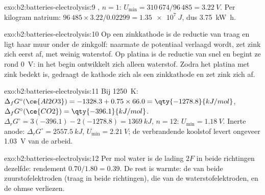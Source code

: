 \begin{solution}{exo:b2:batteries-electrolysis:9}
, $n = 1$: $U_{\min} = 310\,674/96\,485 = \qty{3.22}{V}$.
Per kilogram natrium: $96\,485 \times 3.22/0.02299 = \qty{1.35e7}{J}$, dus
\qty{3.75}{kW.h}.
\end{solution}

\begin{solution}{exo:b2:batteries-electrolysis:10}
Op een zinkkathode is de reductie van  traag en ligt haar muur onder de
zinkgolf: naarmate de potentiaal verlaagd wordt, zet zink zich eerst af, met weinig
waterstof. Op platina is de reductie van  snel en begint ze rond
\qty{0}{V}: in het begin ontwikkelt zich alleen waterstof. Zodra het platina met
zink bedekt is, gedraagt de kathode zich als een zinkkathode en zet zink zich af.
\end{solution}

\begin{solution}{exo:b2:batteries-electrolysis:11}
Bij \qty{1250}{K}: $\Delta_f G^\circ(\ce{Al2O3}) = -1328.3 + 0.75 \times 66.0 =
\qty{-1278.8}{kJ/mol}$, $\Delta_f G^\circ(\ce{CO2}) = \qty{-396.1}{kJ/mol}$. $\Delta_r G^\circ =
3(-396.1) - 2(-1278.8) = \qty{1369}{kJ}$, $n = 12$: $U_{\min} = \qty{1.18}{V}$. Inerte anode:
$\Delta_r G^\circ = \qty{2557.5}{kJ}$, $U_{\min} = \qty{2.21}{V}$; de verbrandende koolstof
levert ongeveer \qty{1.03}{V} van de arbeid.
\end{solution}

\begin{solution}{exo:b2:batteries-electrolysis:12}
Per mol water is de lading $2F$ in beide richtingen dezelfde: rendement $0.70/1.80 =
0.39$. De rest is warmte: de  van beide zuurstofelektroden (traag in
beide richtingen), die van de waterstofelektroden, en de ohmse verliezen.
\end{solution}

